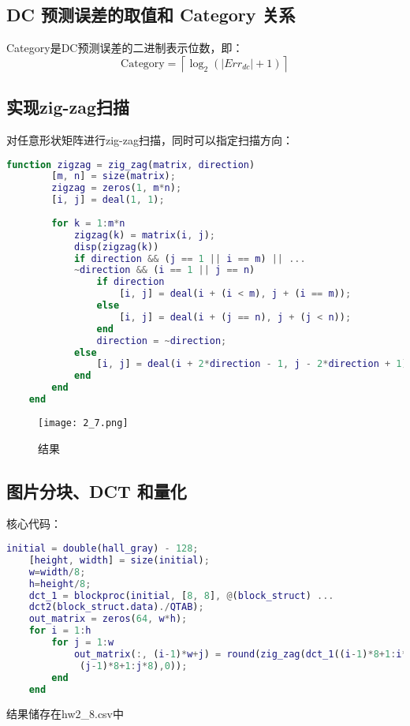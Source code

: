 \documentclass[12pt]{article}
\begin{document}
\subsection{DC 预测误差的取值和 Category 关系}

Category是DC预测误差的二进制表示位数，即：
\begin{equation}
    \text{Category} = \left\lceil \log_2(|Err_{dc}| + 1) \right\rceil
\end{equation}

\subsection{实现zig-zag扫描}

对任意形状矩阵进行zig-zag扫描，同时可以指定扫描方向：

\begin{lstlisting}[language=matlab]
    function zigzag = zig_zag(matrix, direction)
        [m, n] = size(matrix);
        zigzag = zeros(1, m*n);
        [i, j] = deal(1, 1);
        
        for k = 1:m*n
            zigzag(k) = matrix(i, j);
            disp(zigzag(k))
            if direction && (j == 1 || i == m) || ... 
            ~direction && (i == 1 || j == n)
                if direction
                    [i, j] = deal(i + (i < m), j + (i == m));
                else
                    [i, j] = deal(i + (j == n), j + (j < n));
                end
                direction = ~direction;
            else
                [i, j] = deal(i + 2*direction - 1, j - 2*direction + 1);
            end
        end
    end
\end{lstlisting}

\begin{figure}[H]
    \centering
    \texttt{[image: 2\_7.png]}
    \caption{结果}
\end{figure}

\subsection{图片分块、DCT 和量化}
核心代码：
\begin{lstlisting}[language=matlab]
    initial = double(hall_gray) - 128;
    [height, width] = size(initial);
    w=width/8;
    h=height/8;
    dct_1 = blockproc(initial, [8, 8], @(block_struct) ... 
    dct2(block_struct.data)./QTAB);
    out_matrix = zeros(64, w*h);
    for i = 1:h
        for j = 1:w
            out_matrix(:, (i-1)*w+j) = round(zig_zag(dct_1((i-1)*8+1:i*8, ... 
             (j-1)*8+1:j*8),0));
        end
    end
\end{lstlisting}
结果储存在hw2\_8.csv中
\end{document}
